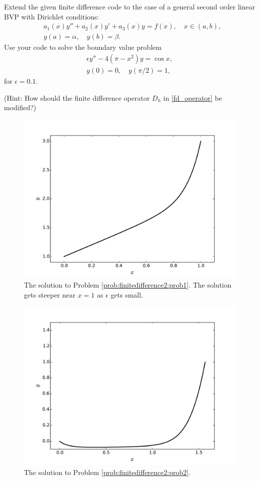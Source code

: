 \begin{problem}
Extend the given finite difference code to the case of a general second order linear BVP with Dirichlet conditions:
\begin{align*}
	&{ } a_1(x)y'' +a_2(x)y'+ a_3(x) y = f(x), \quad x \in (a,b),\\
	&{ } y(a) = \alpha, \quad y(b) = \beta.
\end{align*}
Use your code to solve the boundary value problem
\begin{align*}
	\epsilon y'' - 4(\pi - x^2)y = \cos x, \\
	y(0) = 0, \quad y(\pi/2) = 1,
\end{align*}
for $\epsilon = 0.1$.
\label{prob:finitedifference2:prob2}

(Hint: How should the finite difference operator $D_h$ in \eqref{fd_operator} be modified?) 
\end{problem}

\begin{figure}
\centering
\includegraphics[width=12cm]{figure2.pdf}
\caption{The solution to Problem \ref{prob:finitedifference2:prob1}.
The solution gets steeper near $x = 1$ as $\epsilon $ gets small.}
\end{figure}

\begin{figure}
\centering
\includegraphics[width=12cm]{figure3.pdf}
\caption{The solution to Problem \ref{prob:finitedifference2:prob2}.
}
\end{figure}


